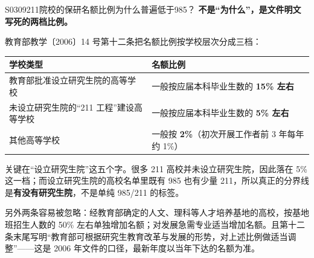 \begin{qa}{S0309}{211院校的保研名额比例为什么普遍低于985？}
\textbf{不是“为什么”，是文件明文写死的两档比例。}

教育部教学〔2006〕14 号第十二条把名额比例按学校层次分成三档：

\par\vspace{2pt}\nobreak\begin{center}\footnotesize
\begin{tabularx}{\textwidth}{>{\raggedright\arraybackslash}X>{\raggedright\arraybackslash}X}
\toprule
\textbf{学校类型} & \textbf{名额比例} \\ \midrule
教育部批准设立研究生院的高等学校 & 一般按应届本科毕业生数的 \textbf{15\% 左右} \\
未设立研究生院的“211 工程”建设高等学校 & 一般按应届本科毕业生数的 \textbf{5\% 左右} \\
其他高等学校 & 一般按 \textbf{2\%}（初次开展工作者前 3 年每年约 1\%） \\
\bottomrule
\end{tabularx}
\end{center}\vspace{2pt}\par

关键在“设立研究生院”这五个字。很多 211 高校并未设立研究生院，因此落在 5\% 这一档；而设立研究生院的高校名单里既有 985 也有少量 211，所以真正的分界线是\textbf{有没有研究生院}，不是单纯 985/211 的标签。

另外两条容易被忽略：经教育部确定的人文、理科等人才培养基地的高校，按基地班招生人数的 50\% 左右单独增加名额；对发展急需专业适当增加名额。且第十二条末尾写明“教育部可根据研究生教育改革与发展的形势，对上述比例做适当调整”——这是 2006 年文件的口径，最新年度以当年下达的名额为准。
\end{qa}

